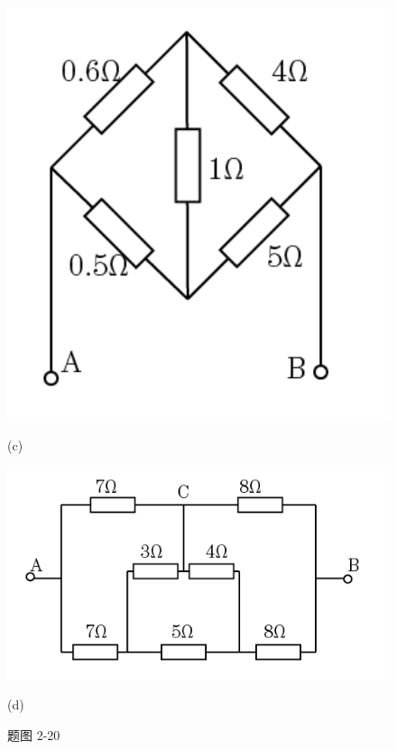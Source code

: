 \documentclass[hyperref, UTF8]{ctexart}
\begin{document}
\begin{figure}[!htb]
\begin{minipage}[t]{0.203\textwidth}
    \includegraphics[width=1\textwidth]{p2-20-c.png}
    \caption*{(c)}
  \end{minipage}
  \begin{minipage}[t]{0.334\textwidth}
    \centering
    \includegraphics[width=1\textwidth]{p2-20-d.png}
    \caption*{(d)}
  \end{minipage}
  \caption*{题图 2-20}
\end{figure}
\end{document}
